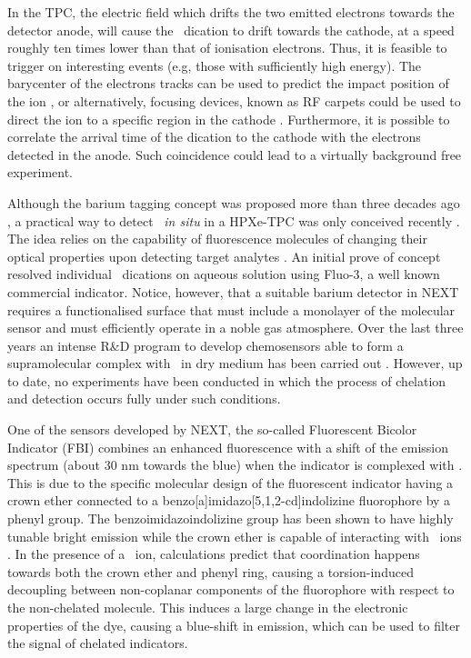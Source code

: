 \documentclass[aps,prl,reprint,longbibliography,superscriptaddress, english]{revtex4-1}
\begin{document}
In the TPC, the electric field which drifts the two emitted electrons towards the detector anode, will cause the \Bapp\ dication to drift towards the cathode, at a speed roughly ten times lower than that of ionisation electrons. Thus, it is feasible to trigger on interesting events (e.g, those with sufficiently high energy). The barycenter of the electrons tracks can be used to predict the impact position of the ion \cite{rivilla_fluorescent_2020}, or alternatively, focusing devices, known as RF carpets could be used to direct the ion to a specific region in the cathode \cite{NEXT:2021idl}. Furthermore, it is possible to correlate the arrival time of the dication to the cathode with the electrons detected in the anode.
Such coincidence could lead to a virtually background free experiment. 

Although the barium tagging concept was proposed more than three decades ago \cite{Moe:1991ik}, a practical way to detect \Bapp\ {\it in situ} in a HPXe-TPC was only conceived recently \cite{Nygren_2015, Jones:2016qiq}. The idea relies on the capability of fluorescence molecules of changing their optical properties upon detecting target analytes \cite{valeur_chemical,wolfbeis_materials_2005}. An initial prove of concept \cite{McDonald:2017izm} resolved individual \Bapp\ dications on aqueous solution using Fluo-3, a well known commercial indicator. Notice, however, that a suitable barium detector in NEXT requires a functionalised surface that must include a monolayer of the molecular sensor and must efficiently operate in a noble gas atmosphere. Over the last three years an intense R\&D program to develop chemosensors able to form a supramolecular complex with \Bapp\ in dry medium has been carried out \cite{Thapa:2019zjk, rivilla_fluorescent_2020,thapa_demonstration_2021}. However, up to date, no experiments have been conducted in which the process of chelation and detection occurs fully under such conditions.

One of the sensors developed by NEXT, the so-called
Fluorescent Bicolor Indicator (FBI) \cite{rivilla_fluorescent_2020} combines an enhanced fluorescence with a shift of the emission spectrum (about 30 nm towards the blue) when the indicator is complexed with \Bapp.  This is due to the specific molecular design of the fluorescent indicator having a crown ether connected to a benzo[a]imidazo[5,1,2-cd]indolizine fluorophore by a phenyl group. The benzoimidazoindolizine group has been shown to have highly tunable bright emission\cite{Stasyuk_benzo,Levesque_general} while the crown ether is capable of interacting with \Bapp\ ions \cite{valeur_chemical,maleknia_cavity-size-dependent_2002}. In the presence of a \Bapp\ ion, calculations predict that coordination happens towards both the crown ether and phenyl ring, causing a  {torsion-induced decoupling between non-coplanar components of the fluorophore with respect} to the non-chelated molecule. This induces a large change in the electronic properties of the dye, causing a blue-shift in emission, which can be used to filter the signal of chelated indicators.
\end{document}
